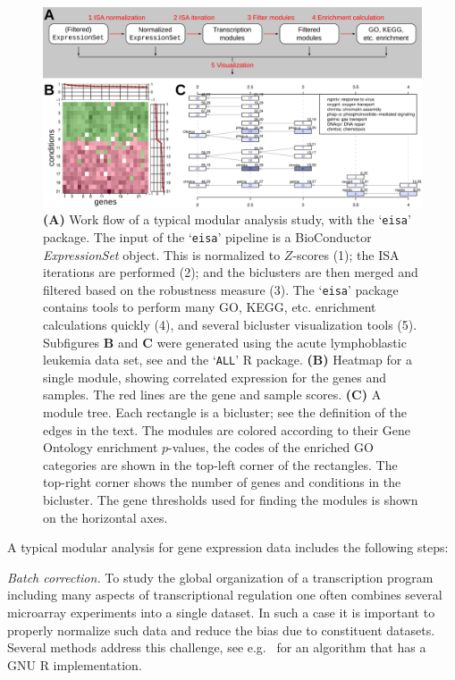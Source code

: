 \documentclass{bioinfo}
\newcommand{\Rpackage}[1]{`\texttt{#1}'}
\newcommand{\Rclass}[1]{\textsl{#1}}
\newcommand{\subfig}[1]{\textbf{#1}}
\begin{document}
\begin{figure}
\centering
\includegraphics[width=\textwidth]{isa2workflow3}
\caption{\subfig{(A)} Work flow of a typical modular analysis study, with the
  \Rpackage{eisa} package. The input of the \Rpackage{eisa} pipeline is a
  BioConductor \Rclass{ExpressionSet} object. This is normalized to
  $Z$-scores (1); the ISA iterations are performed (2); and the
  biclusters are then merged and filtered based on the robustness
  measure (3). The \Rpackage{eisa} package contains tools to perform
  many GO, KEGG, etc. enrichment calculations quickly (4), and several
  bicluster visualization tools (5).
  Subfigures \subfig{B} and \subfig{C} were generated
  using the acute lymphoblastic leukemia data set, see
  \citep{chiaretti04} and the \Rpackage{ALL} R package.
  \subfig{(B)} Heatmap for a single module, showing correlated
  expression for the genes and samples. The red lines are the gene and
  sample scores.
  \subfig{(C)} A module tree. Each rectangle is a bicluster; see the
  definition of the edges in the text. The modules are colored
  according to their Gene Ontology enrichment $p$-values, the codes of
  the enriched GO categories are shown in the top-left corner of the
  rectangles. The top-right corner shows the number of genes and
  conditions in the bicluster. The gene thresholds used for finding
  the modules is shown on the horizontal axes.
}
\label{fig:workflow}
\end{figure}

A typical modular analysis for gene expression data includes the following
steps:

\emph{Batch correction.}
To study the global organization of a transcription program including
many aspects of transcriptional regulation one often combines several
microarray experiments into a single dataset. In such a case it is important
to properly normalize such data and reduce the bias due to constituent
datasets. Several methods address this challenge,
see e.g.~\citep{johnson07} for an algorithm that has a GNU R
implementation. 
\end{document}
